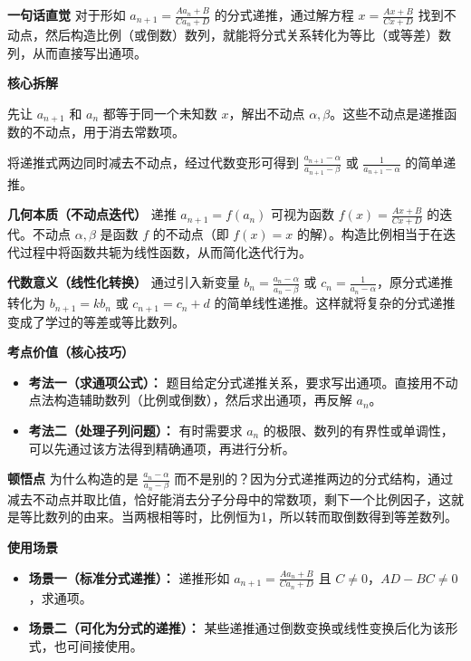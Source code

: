 \begin{explanationbox}
	\textbf{\textcolor{CExplanation}{一句话直觉}}
	对于形如 $a_{n+1}=\frac{Aa_n+B}{Ca_n+D}$ 的分式递推，通过解方程 $x=\frac{Ax+B}{Cx+D}$ 找到不动点，然后构造比例（或倒数）数列，就能将分式关系转化为等比（或等差）数列，从而直接写出通项。

	\medskip
	\textbf{\textcolor{CExplanation}{核心拆解}}
	\begin{description}[style=nextline, leftmargin=2.8em, labelsep=0.5em, itemsep=0.45em]
		\item[\textbf{要点一（不动点求解）：}]
			先让 $a_{n+1}$ 和 $a_n$ 都等于同一个未知数 $x$，解出不动点 $\alpha,\beta$。这些不动点是递推函数的不动点，用于消去常数项。
		\item[\textbf{要点二（结构变形）：}]
			将递推式两边同时减去不动点，经过代数变形可得到 $\frac{a_{n+1}-\alpha}{a_{n+1}-\beta}$ 或 $\frac{1}{a_{n+1}-\alpha}$ 的简单递推。
	\end{description}

	\medskip
	\textbf{\textcolor{CExplanation}{几何本质（不动点迭代）}}
	递推 $a_{n+1}=f(a_n)$ 可视为函数 $f(x)=\frac{Ax+B}{Cx+D}$ 的迭代。不动点 $\alpha,\beta$ 是函数 $f$ 的不动点（即 $f(x)=x$ 的解）。构造比例相当于在迭代过程中将函数共轭为线性函数，从而简化迭代行为。

	\medskip
	\textbf{\textcolor{CExplanation}{代数意义（线性化转换）}}
	通过引入新变量 $b_n=\frac{a_n-\alpha}{a_n-\beta}$ 或 $c_n=\frac{1}{a_n-\alpha}$，原分式递推转化为 $b_{n+1}=k b_n$ 或 $c_{n+1}=c_n+d$ 的简单线性递推。这样就将复杂的分式递推变成了学过的等差或等比数列。

	\medskip
	\textbf{\textcolor{CExplanation}{考点价值（核心技巧）}}
	\begin{itemize}[leftmargin=*, itemsep=0.5em, topsep=0.4em]
		\item \textbf{考法一（求通项公式）：} 题目给定分式递推关系，要求写出通项。直接用不动点法构造辅助数列（比例或倒数），然后求出通项，再反解 $a_n$。
		\item \textbf{考法二（处理子列问题）：} 有时需要求 $a_n$ 的极限、数列的有界性或单调性，可以先通过该方法得到精确通项，再进行分析。
	\end{itemize}

	\medskip
	\textbf{\textcolor{CExplanation}{顿悟点}}
	为什么构造的是 $\frac{a_n-\alpha}{a_n-\beta}$ 而不是别的？因为分式递推两边的分式结构，通过减去不动点并取比值，恰好能消去分子分母中的常数项，剩下一个比例因子，这就是等比数列的由来。当两根相等时，比例恒为1，所以转而取倒数得到等差数列。

	\medskip
	\textbf{\textcolor{CExplanation}{使用场景}}
	\begin{itemize}[leftmargin=*, itemsep=0.5em, topsep=0.4em]
		\item \textbf{场景一（标准分式递推）：} 递推形如 $a_{n+1}=\frac{Aa_n+B}{Ca_n+D}$ 且 $C\neq0$，$AD-BC\neq0$，求通项。
		\item \textbf{场景二（可化为分式的递推）：} 某些递推通过倒数变换或线性变换后化为该形式，也可间接使用。
	\end{itemize}

\end{explanationbox}
